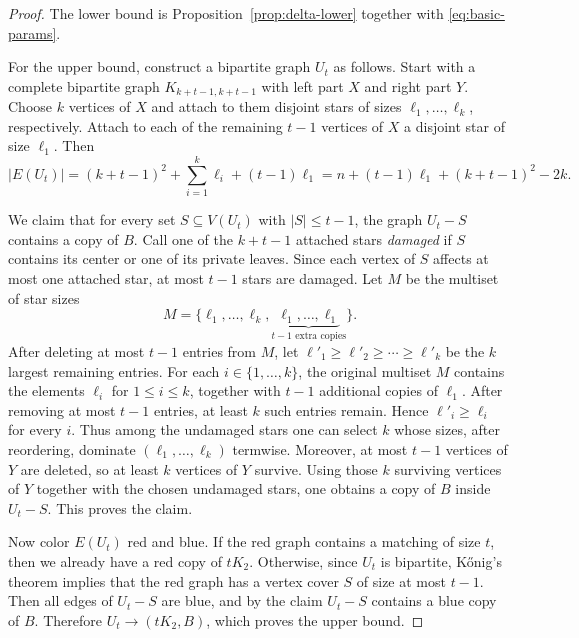 \documentclass[11pt]{article}
\theoremstyle{definition}
\theoremstyle{remark}
\begin{document}
\begin{proof}
The lower bound is Proposition~\ref{prop:delta-lower} together with
\eqref{eq:basic-params}.

For the upper bound, construct a bipartite graph $U_t$ as follows. Start with a complete
bipartite graph $K_{k+t-1,k+t-1}$ with left part $X$ and right part $Y$. Choose $k$ vertices
of $X$ and attach to them disjoint stars of sizes $\ell_1,\dots,\ell_k$, respectively. Attach to
each of the remaining $t-1$ vertices of $X$ a disjoint star of size $\ell_1$. Then
\[
|E(U_t)|=(k+t-1)^2+\sum_{i=1}^k\ell_i+(t-1)\ell_1
= n+(t-1)\ell_1+(k+t-1)^2-2k.
\]

We claim that for every set $S\subseteq V(U_t)$ with $|S|\le t-1$, the graph $U_t-S$
contains a copy of $B$. Call one of the $k+t-1$ attached stars \emph{damaged} if $S$
contains its center or one of its private leaves. Since each vertex of $S$ affects at most one
attached star, at most $t-1$ stars are damaged. Let $M$ be the multiset of star sizes
\[
M=\{\ell_1,\dots,\ell_k,\underbrace{\ell_1,\dots,\ell_1}_{t-1\text{ extra copies}}\}.
\]
After deleting at most $t-1$ entries from $M$, let
$\ell'_1\ge \ell'_2\ge \cdots\ge \ell'_k$
be the $k$ largest remaining entries. For each $i\in\{1,\dots,k\}$, the original multiset $M$ contains the elements $\ell_i$ for $1 \leq i \leq k$, together with $t-1$ additional copies of $\ell_1$. After removing at most $t-1$ entries, at least $k$ such entries
remain. Hence $\ell'_i\ge \ell_i$ for every $i$. Thus among the undamaged stars one can select
$k$ whose sizes, after reordering, dominate $(\ell_1,\dots,\ell_k)$ termwise. Moreover, at most
$t-1$ vertices of $Y$ are deleted, so at least $k$ vertices of $Y$ survive. Using those $k$
surviving vertices of $Y$ together with the chosen undamaged stars, one obtains a copy of
$B$ inside $U_t-S$. This proves the claim.

Now color $E(U_t)$ red and blue. If the red graph contains a matching of size $t$, then we
already have a red copy of $tK_2$. Otherwise, since $U_t$ is bipartite, K\H{o}nig's theorem
implies that the red graph has a vertex cover $S$ of size at most $t-1$. Then all edges of
$U_t-S$ are blue, and by the claim $U_t-S$ contains a blue copy of $B$. Therefore
$U_t\to(tK_2,B)$, which proves the upper bound.
\end{proof}
\end{document}
